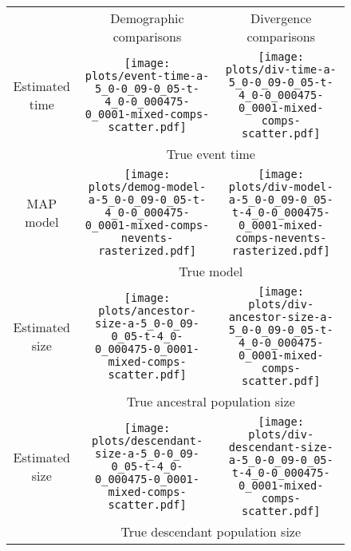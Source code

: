 \documentclass[border=10pt,varwidth=30cm]{standalone}
\begin{document}
\begin{figure}
    \centering
    \begin{tabular}{@{}ccc@{}}
        & \multirow{1}{0.15\textwidth}{\Large\centering Demographic comparisons}
        & \multirow{1}{0.15\textwidth}{\Large\centering Divergence comparisons} \\[5ex]
        \multirow{1}{*}[8em]{\begin{sideways}\large Estimated time\end{sideways}}
        & \texttt{[image: plots/event-time-a-5\_0-0\_09-0\_05-t-4\_0-0\_000475-0\_0001-mixed-comps-scatter.pdf]}
        & \texttt{[image: plots/div-time-a-5\_0-0\_09-0\_05-t-4\_0-0\_000475-0\_0001-mixed-comps-scatter.pdf]} \\
        & \multicolumn{2}{c}{\large True event time} \\
        \multirow{1}{*}[7.5em]{\begin{sideways}\large MAP model\end{sideways}}
        & \texttt{[image: plots/demog-model-a-5\_0-0\_09-0\_05-t-4\_0-0\_000475-0\_0001-mixed-comps-nevents-rasterized.pdf]}
        & \texttt{[image: plots/div-model-a-5\_0-0\_09-0\_05-t-4\_0-0\_000475-0\_0001-mixed-comps-nevents-rasterized.pdf]} \\
        & \multicolumn{2}{c}{\large True model} \\
        \multirow{1}{*}[8em]{\begin{sideways}\large Estimated size\end{sideways}}
        & \texttt{[image: plots/ancestor-size-a-5\_0-0\_09-0\_05-t-4\_0-0\_000475-0\_0001-mixed-comps-scatter.pdf]}
        & \texttt{[image: plots/div-ancestor-size-a-5\_0-0\_09-0\_05-t-4\_0-0\_000475-0\_0001-mixed-comps-scatter.pdf]} \\
        & \multicolumn{2}{c}{\large True ancestral population size} \\
        \multirow{1}{*}[8em]{\begin{sideways}\large Estimated size\end{sideways}}
        & \texttt{[image: plots/descendant-size-a-5\_0-0\_09-0\_05-t-4\_0-0\_000475-0\_0001-mixed-comps-scatter.pdf]}
        & \texttt{[image: plots/div-descendant-size-a-5\_0-0\_09-0\_05-t-4\_0-0\_000475-0\_0001-mixed-comps-scatter.pdf]} \\
        & \multicolumn{2}{c}{\large True descendant population size} \\
    \end{tabular}
\end{figure}
\end{document}
